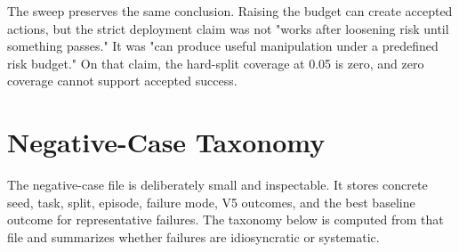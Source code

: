 \documentclass{article}
\begin{document}
\begin{table}[t]
\centering
\scriptsize
{}
\caption{Fixed-risk budget sweep. The strict 0.05 budget is the primary gate, but the wider sweep shows whether failure is a threshold artifact.}
\label{tab:fixedsweep}
\end{table}


The sweep preserves the same conclusion. Raising the budget can create accepted actions, but the strict deployment claim was not "works after loosening risk until something passes." It was "can produce useful manipulation under a predefined risk budget." On that claim, the hard-split coverage at 0.05 is zero, and zero coverage cannot support accepted success.

\section{Negative-Case Taxonomy}
The negative-case file is deliberately small and inspectable. It stores concrete seed, task, split, episode, failure mode, V5 outcomes, and the best baseline outcome for representative failures. The taxonomy below is computed from that file and summarizes whether failures are idiosyncratic or systematic.
\end{document}
